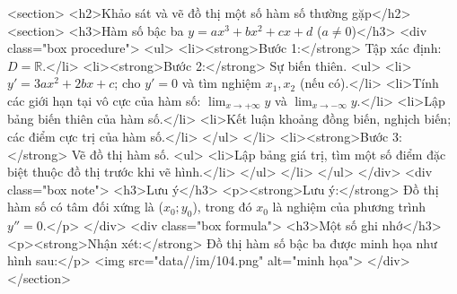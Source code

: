 <section>
    <h2>Khảo sát và vẽ đồ thị một số hàm số thường gặp</h2>
    <section>
        <h3>Hàm số bậc ba \(y = ax^3 + bx^2 + cx + d\) (\(a \ne 0\))</h3>
        <div class="box procedure">
            <ul>
                <li><strong>Bước 1:</strong> Tập xác định: \(D=\mathbb{R}\).</li>
                <li><strong>Bước 2:</strong> Sự biến thiên.
                    <ul>
                        <li>\(y' = 3ax^2+2bx+c\); cho \(y'=0\) và tìm nghiệm \(x_1, x_2\) (nếu có).</li>
                        <li>Tính các giới hạn tại vô cực của hàm số: \(\lim_{x \to +\infty} y\) và \(\lim_{x \to -\infty} y\).</li>
                        <li>Lập bảng biến thiên của hàm số.</li>
                        <li>Kết luận khoảng đồng biến, nghịch biến; các điểm cực trị của hàm số.</li>
                    </ul>
                </li>
                <li><strong>Bước 3:</strong> Vẽ đồ thị hàm số.
                    <ul>
                        <li>Lập bảng giá trị, tìm một số điểm đặc biệt thuộc đồ thị trước khi vẽ hình.</li>
                    </ul>
                </li>
            </ul>
        </div>
        <div class="box note">
            <h3>Lưu ý</h3>
            <p><strong>Lưu ý:</strong> Đồ thị hàm số có tâm đối xứng là (\(x_0; y_0\)), trong đó \(x_0\) là nghiệm của phương trình \(y''=0\).</p>
        </div>
        <div class="box formula">
            <h3>Một số ghi nhớ</h3>
            <p><strong>Nhận xét:</strong> Đồ thị hàm số bậc ba được minh họa như hình sau:</p>
            <img src="data//im/104.png" alt="minh họa">
        </div>
    </section>

